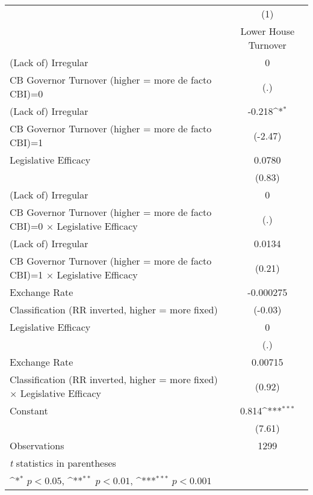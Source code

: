 {
\def\sym#1{\ifmmode^{#1}\else\(^{#1}\)\fi}
\begin{tabular}{l*{1}{c}}
\hline\hline
                    &\multicolumn{1}{c}{(1)}\\
                    &\multicolumn{1}{c}{Lower House Turnover}\\
\hline
(Lack of) Irregular &           0         \\
CB Governor Turnover (higher = more de facto CBI)=0&         (.)         \\
[1em]
(Lack of) Irregular &      -0.218\sym{*}  \\
CB Governor Turnover (higher = more de facto CBI)=1&     (-2.47)         \\
[1em]
Legislative Efficacy&      0.0780         \\
                    &      (0.83)         \\
[1em]
(Lack of) Irregular &           0         \\
CB Governor Turnover (higher = more de facto CBI)=0 $\times$ Legislative Efficacy&         (.)         \\
[1em]
(Lack of) Irregular &      0.0134         \\
CB Governor Turnover (higher = more de facto CBI)=1 $\times$ Legislative Efficacy&      (0.21)         \\
[1em]
Exchange Rate       &   -0.000275         \\
Classification (RR inverted, higher = more fixed)&     (-0.03)         \\
[1em]
Legislative Efficacy&           0         \\
                    &         (.)         \\
[1em]
Exchange Rate       &     0.00715         \\
Classification (RR inverted, higher = more fixed) $\times$ Legislative Efficacy&      (0.92)         \\
[1em]
Constant            &       0.814\sym{***}\\
                    &      (7.61)         \\
\hline
Observations        &        1299         \\
\hline\hline
\multicolumn{2}{l}{\footnotesize \textit{t} statistics in parentheses}\\
\multicolumn{2}{l}{\footnotesize \sym{*} \(p<0.05\), \sym{**} \(p<0.01\), \sym{***} \(p<0.001\)}\\
\end{tabular}
}
